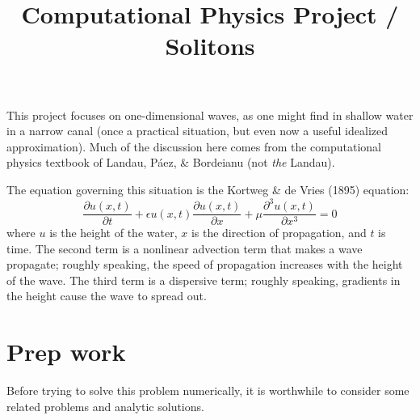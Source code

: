 \documentclass[11pt, preprint]{aastex}
\begin{document}
\title{\bf Computational Physics Project / Solitons}

This project focuses on one-dimensional waves, as one might find in
shallow water in a narrow canal (once a practical situation, but even
now a useful idealized approximation). Much of the discussion here
comes from the computational physics textbook of Landau, P{\'a}ez, \&
Bordeianu (not {\it the} Landau).

The equation governing this situation is the Kortweg \& de Vries
(1895) equation:
\begin{equation}
\label{eq:soliton}
\frac{\partial u(x,t)}{\partial t} + \epsilon u(x,t) \frac{\partial
  u(x,t)}{\partial x} + \mu \frac{\partial^3 u(x,t)}{\partial x^3} = 0
\end{equation}
where $u$ is the height of the water, $x$ is the direction of
propagation, and $t$ is time. The second term is a nonlinear advection
term that makes a wave propagate; roughly speaking, the speed of
propagation increases with the height of the wave. The third term is a
dispersive term; roughly speaking, gradients in the height cause the
wave to spread out.

\section{Prep work}

Before trying to solve this problem numerically, it is worthwhile to
consider some related problems and analytic solutions. 
\end{document}
